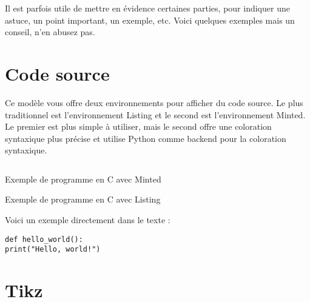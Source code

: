  Il est parfois utile de mettre en évidence certaines parties, pour indiquer une astuce, un point important, un exemple, etc. Voici quelques exemples mais un conseil, n'en abusez pas.

\begin{callout}
    \lipsum[1][1]
\end{callout}

\begin{callout}
    \lipsum[1][2]
\end{callout}

\begin{callout}
    \lipsum[1][3]
\end{callout}

\begin{callout}
    \lipsum[1][4]
\end{callout}

\section{Code source}

Ce modèle vous offre deux environnements pour afficher du code source. Le plus traditionnel est l'environnement Listing et le second est l'environnement Minted. Le premier est plus simple à utiliser, mais le second offre une coloration syntaxique plus précise et utilise Python comme backend pour la coloration syntaxique.

\begin{listing}[ht]
    \inputminted{c}{assets/code/fibonacci.c}
    \caption{Exemple de programme en C \label{cminted} avec Minted}
\end{listing}

\begin{listing}[ht]
    
    \caption{Exemple de programme en C \label{clist} avec Listing}
\end{listing}

Voici un exemple directement dans le texte :

\begin{verbatim}
def hello_world():
print("Hello, world!")
\end{verbatim}

\clearpage
\section{Tikz}

